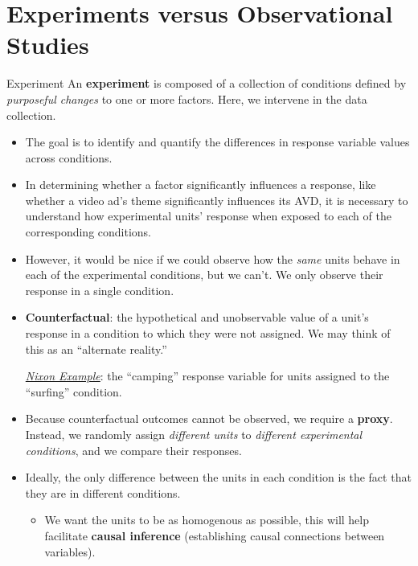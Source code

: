 \section{Experiments versus Observational Studies}
\begin{Definition}{Experiment}{}
    An \textbf{experiment} is composed of a collection of conditions defined by
    \emph{purposeful changes} to one or more factors. Here, we intervene in the data collection.
\end{Definition}
\begin{itemize}
    \item The goal is to identify and quantify the differences in response variable values
          across conditions.
    \item In determining whether a factor significantly influences a response,
          like whether a video ad's theme significantly influences its AVD, it is
          necessary to understand how experimental units' response when exposed to each
          of the corresponding conditions.
    \item However, it would be nice if we could observe how the \emph{same} units behave in
          each of the experimental conditions, but we can't. We only observe their response in a
          single condition.
    \item \textbf{Counterfactual}: the hypothetical and unobservable value of a unit's response
          in a condition to which they were not assigned. We may think of this
          as an ``alternate reality.''
          \begin{Example}{}{}
              \emph{\hyperref[ex:nixon_ex]{Nixon Example}}: the ``camping'' response
              variable for units assigned to the ``surfing'' condition.
          \end{Example}
    \item Because counterfactual outcomes cannot be observed, we require a \textbf{proxy}.
          Instead, we randomly assign \emph{different units} to \emph{different experimental
              conditions},
          and we compare their responses.
    \item Ideally, the only difference between the units in each condition is the fact that
          they are in different conditions.
          \begin{itemize}
              \item We want the units to be as homogenous as possible, this will help facilitate
                    \textbf{causal inference} (establishing causal connections between variables).

\end{itemize}
\end{itemize}
